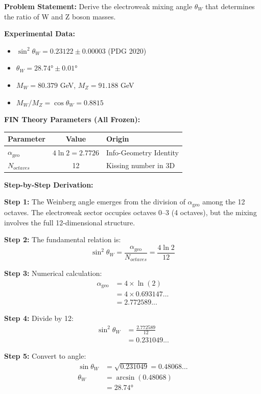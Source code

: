 \documentclass[11pt, a4paper]{article}
\theoremstyle{remark}
\newcommand{\alphageo}{\alpha_{\text{geo}}}
\begin{document}
\textbf{Problem Statement:} Derive the electroweak mixing angle $\theta_W$ that determines the ratio of W and Z boson masses.

\textbf{Experimental Data:}
\begin{itemize}
    \item $\sin^2\theta_W = 0.23122 \pm 0.00003$ (PDG 2020)
    \item $\theta_W = 28.74° \pm 0.01°$
    \item $M_W = 80.379$ GeV, $M_Z = 91.188$ GeV
    \item $M_W/M_Z = \cos\theta_W = 0.8815$
\end{itemize}

\textbf{FIN Theory Parameters (All Frozen):}
\begin{table}[H]
\centering
\begin{tabular}{|l|c|l|}
\hline
\textbf{Parameter} & \textbf{Value} & \textbf{Origin} \\
\hline
$\alphageo$ & $4\ln 2 = 2.7726$ & Info-Geometry Identity \\
$N_{octaves}$ & 12 & Kissing number in 3D \\
\hline
\end{tabular}
\end{table}

\textbf{Step-by-Step Derivation:}

\textbf{Step 1:} The Weinberg angle emerges from the division of $\alphageo$ among the 12 octaves. The electroweak sector occupies octaves 0--3 (4 octaves), but the mixing involves the full 12-dimensional structure.

\textbf{Step 2:} The fundamental relation is:
\begin{equation}
\sin^2\theta_W = \frac{\alphageo}{N_{octaves}} = \frac{4\ln 2}{12}
\end{equation}

\textbf{Step 3:} Numerical calculation:
\begin{align}
\alphageo &= 4 \times \ln(2) \\
&= 4 \times 0.693147... \\
&= 2.772589...
\end{align}

\textbf{Step 4:} Divide by 12:
\begin{align}
\sin^2\theta_W &= \frac{2.772589}{12} \\
&= 0.231049...
\end{align}

\textbf{Step 5:} Convert to angle:
\begin{align}
\sin\theta_W &= \sqrt{0.231049} = 0.48068... \\
\theta_W &= \arcsin(0.48068) \\
&= 28.74°
\end{align}
\end{document}
